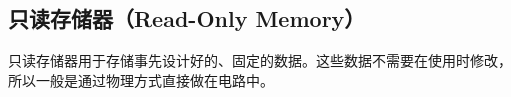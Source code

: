 \subsection{只读存储器（Read-Only Memory）}
只读存储器用于存储事先设计好的、固定的数据。这些数据不需要在使用时修改，所以一般是通过物理方式直接做在电路中。
\begin{figure}[!ht]
    \centering
    \qquad

\end{figure}
